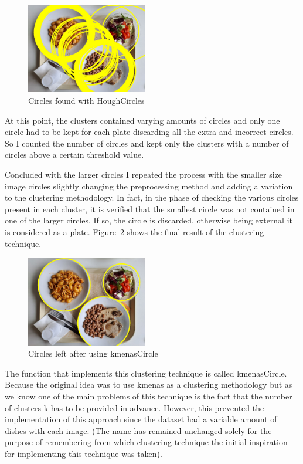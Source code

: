 \documentclass[
	a4paper, %
	10pt, %
	unnumberedsections, %
	twoside, %
]{LTJournalArticle}
\begin{document}
\begin{figure}[t]
    \centering
    \includegraphics[width=0.47\textwidth]{Images/CircBoxes_nocluster_tray6.1.jpg}
    \caption{Circles found with HoughCircles}
    \label{fig:CircBoxes_nocluster_tray6.1}
\end{figure}

At this point, the clusters contained varying amounts of circles and only one circle had to be kept for each plate discarding all the extra and incorrect circles. So I counted the number of circles and kept only the clusters with a number of circles above a certain threshold value.

Concluded with the larger circles I repeated the process with the smaller size image circles slightly changing the preprocessing method and adding a variation to the clustering methodology. In fact, in the phase of checking the various circles present in each cluster, it is verified that the smallest circle was not contained in one of the larger circles. If so, the circle is discarded, otherwise being external it is considered as a plate. Figure~\ref{fig:CircBoxes_tray6.1} shows the final result of the clustering technique.

\begin{figure}[t]
    \centering
    \includegraphics[width=0.47\textwidth]{Images/CircBoxes_tray6.1.jpg}
    \caption{Circles left after using kmenasCircle}
    \label{fig:CircBoxes_tray6.1}
\end{figure}

The function that implements this clustering technique is called kmenasCircle. Because the original idea was to use kmenas as a clustering methodology but as we know one of the main problems of this technique is the fact that the number of clusters k has to be provided in advance. However, this prevented the implementation of this approach since the dataset had a variable amount of dishes with each image.
(The name has remained unchanged solely for the purpose of remembering from which clustering technique the initial inspiration for implementing this technique was taken).
\end{document}
